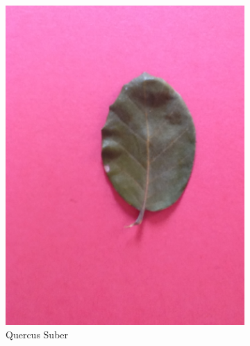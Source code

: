 \begin{figure}[ht]
	\begin{subfigure}{0.5\textwidth}
		\centering\includegraphics[width=\linewidth]{bab3/figures/quercus_suber.JPG}
		\caption{Quercus Suber}
		\label{fig:quercus_suber}
	\end{subfigure}
	~
	\begin{subfigure}{0.5\textwidth}

\end{subfigure}
\end{figure}
